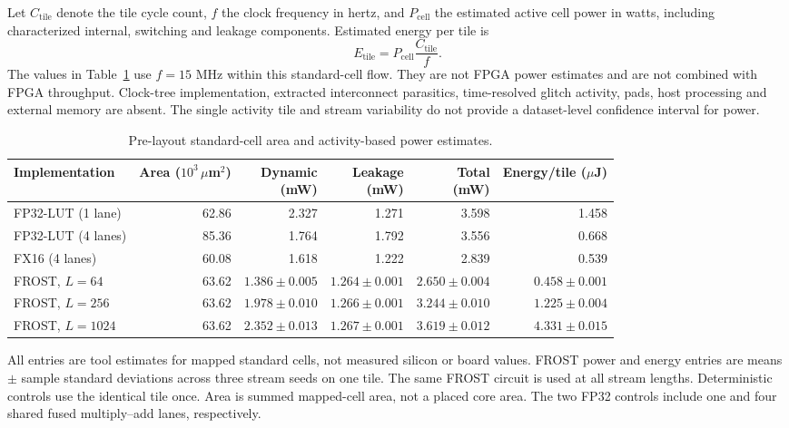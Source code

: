 Let $C_{\mathrm{tile}}$ denote the tile cycle count, $f$ the clock frequency
in hertz, and $P_{\mathrm{cell}}$ the estimated active cell power in watts,
including characterized internal, switching and leakage components.
Estimated energy per tile is
\begin{equation}
E_{\mathrm{tile}}=P_{\mathrm{cell}}\frac{C_{\mathrm{tile}}}{f}.
\label{eq:fused_tile_energy}
\end{equation}
The values in Table~\ref{tab:fused_asic_power} use $f=15$ MHz within this
standard-cell flow. They are not FPGA power estimates and are not combined
with FPGA throughput. Clock-tree implementation, extracted interconnect
parasitics, time-resolved glitch activity, pads, host processing and
external memory are absent. The single activity tile and stream variability
do not provide a dataset-level confidence interval for power.

\begin{table}[!htbp]
\centering
\caption{Pre-layout standard-cell area and activity-based power estimates.}
\label{tab:fused_asic_power}
\fontsize{8}{9.5}\selectfont\setlength{\tabcolsep}{2.5pt}
\begin{tabular*}{\linewidth}{@{\extracolsep{\fill}}lrrrrr@{}}
\toprule
Implementation & \shortstack{Area\\($10^3\,\mu$m$^2$)} & \shortstack{Dynamic\\(mW)} & \shortstack{Leakage\\(mW)} & \shortstack{Total\\(mW)} & \shortstack{Energy/tile\\($\mu$J)}\\
\midrule
FP32-LUT (1 lane) & 62.86 & 2.327 & 1.271 & 3.598 & 1.458 \\
FP32-LUT (4 lanes) & 85.36 & 1.764 & 1.792 & 3.556 & 0.668 \\
FX16 (4 lanes) & 60.08 & 1.618 & 1.222 & 2.839 & 0.539 \\
FROST, $L=64$ & 63.62 & $1.386\pm0.005$ & $1.264\pm0.001$ & $2.650\pm0.004$ & $0.458\pm0.001$ \\
FROST, $L=256$ & 63.62 & $1.978\pm0.010$ & $1.266\pm0.001$ & $3.244\pm0.010$ & $1.225\pm0.004$ \\
FROST, $L=1024$ & 63.62 & $2.352\pm0.013$ & $1.267\pm0.001$ & $3.619\pm0.012$ & $4.331\pm0.015$ \\
\bottomrule
\end{tabular*}
\par\smallskip\footnotesize
All entries are tool estimates for mapped standard cells, not measured
silicon or board values. FROST power and energy entries are means
$\pm$ sample standard deviations across three stream seeds on one tile.
The same FROST circuit is used at all stream lengths. Deterministic
controls use the identical tile once. Area is summed mapped-cell area,
not a placed core area. The two FP32 controls include one and four
shared fused multiply--add lanes, respectively.
\end{table}

